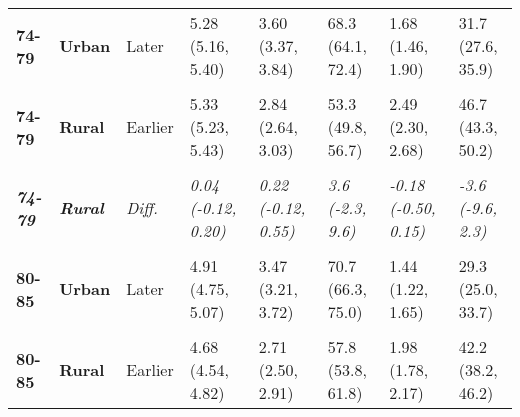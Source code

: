\begin{table}[!h]
{{\begin{tabular}[t]{>{}l>{}lllllll}
\cmidrule{1-8}
\textbf{74-79} & \textbf{Urban} & Later & 5.28 (5.16, 5.40) & 3.60 (3.37, 3.84) & 68.3 (64.1, 72.4) & 1.68 (1.46, 1.90) & 31.7 (27.6, 35.9)\\
\cmidrule{1-8}
\em{\textbf{\cellcolor{gray!10}{74-79}}} & \em{\textbf{\cellcolor{gray!10}{Urban}}} & \em{\cellcolor{gray!10}{Diff.}} & \em{\cellcolor{gray!10}{0.06 (-0.11, 0.23)}} & \em{\cellcolor{gray!10}{0.50 (0.17, 0.83)**}} & \em{\cellcolor{gray!10}{8.8 (3.0, 14.7)**}} & \em{\cellcolor{gray!10}{-0.44 (-0.75, -0.13)**}} & \em{\cellcolor{gray!10}{-8.8 (-14.7, -3.0)**}}\\
\cmidrule{1-8}
\textbf{74-79} & \textbf{Rural} & Earlier & 5.33 (5.23, 5.43) & 2.84 (2.64, 3.03) & 53.3 (49.8, 56.7) & 2.49 (2.30, 2.68) & 46.7 (43.3, 50.2)\\
\cmidrule{1-8}
\textbf{\cellcolor{gray!10}{74-79}} & \textbf{\cellcolor{gray!10}{Rural}} & \cellcolor{gray!10}{Later} & \cellcolor{gray!10}{5.37 (5.24, 5.50)} & \cellcolor{gray!10}{3.06 (2.79, 3.33)} & \cellcolor{gray!10}{56.9 (52.0, 61.8)} & \cellcolor{gray!10}{2.31 (2.04, 2.58)} & \cellcolor{gray!10}{43.1 (38.2, 48.0)}\\
\cmidrule{1-8}
\em{\textbf{74-79}} & \em{\textbf{Rural}} & \em{Diff.} & \em{0.04 (-0.12, 0.20)} & \em{0.22 (-0.12, 0.55)} & \em{3.6 (-2.3, 9.6)} & \em{-0.18 (-0.50, 0.15)} & \em{-3.6 (-9.6, 2.3)}\\
\cmidrule{1-8}
\textbf{\cellcolor{gray!10}{80-85}} & \textbf{\cellcolor{gray!10}{Urban}} & \cellcolor{gray!10}{Earlier} & \cellcolor{gray!10}{4.87 (4.73, 5.01)} & \cellcolor{gray!10}{2.86 (2.61, 3.11)} & \cellcolor{gray!10}{58.8 (54.1, 63.4)} & \cellcolor{gray!10}{2.01 (1.78, 2.24)} & \cellcolor{gray!10}{41.2 (36.6, 45.9)}\\
\cmidrule{1-8}
\textbf{80-85} & \textbf{Urban} & Later & 4.91 (4.75, 5.07) & 3.47 (3.21, 3.72) & 70.7 (66.3, 75.0) & 1.44 (1.22, 1.65) & 29.3 (25.0, 33.7)\\
\cmidrule{1-8}
\em{\textbf{\cellcolor{gray!10}{80-85}}} & \em{\textbf{\cellcolor{gray!10}{Urban}}} & \em{\cellcolor{gray!10}{Diff.}} & \em{\cellcolor{gray!10}{0.04 (-0.17, 0.25)}} & \em{\cellcolor{gray!10}{0.61 (0.25, 0.96)***}} & \em{\cellcolor{gray!10}{11.9 (5.5, 18.3)***}} & \em{\cellcolor{gray!10}{-0.57 (-0.88, -0.25)***}} & \em{\cellcolor{gray!10}{-11.9 (-18.3, -5.5)***}}\\
\cmidrule{1-8}
\textbf{80-85} & \textbf{Rural} & Earlier & 4.68 (4.54, 4.82) & 2.71 (2.50, 2.91) & 57.8 (53.8, 61.8) & 1.98 (1.78, 2.17) & 42.2 (38.2, 46.2)\\

\end{tabular}}}
\end{table}
